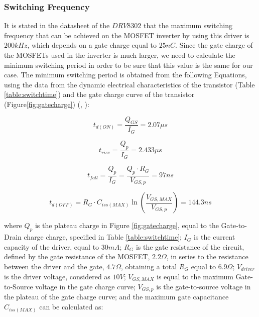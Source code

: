 \subsubsection{Switching Frequency}\label{subsec:sw_freq}

It is stated in the datasheet of the $DRV8302$ that the maximum switching frequency that can be achieved on the \ac{MOSFET} inverter by using this driver is $200 kHz$, which depends on a gate charge equal to $25 nC$. Since the gate charge of the \ac{MOSFET}s used in the inverter is much larger, we need to calculate the minimum switching period in order to be sure that this value is the same for our case. The minimum switching period is obtained from the following Equations, using the data from the dynamic electrical characteristics of the transistor (Table \ref{table:switchtime}) and the gate charge curve of the transistor (Figure\ref{fig:gatecharge}) (\citeauthor{GhioniPowerElec}, \citeyear{GhioniPowerElec}):

\begin{equation}
	t_{d(ON)} = \frac{Q_{GS}}{I_{G}} = 2.07\mu s
\end{equation}

\begin{equation}
	t_{rise} = \frac{Q_{p}}{I_{G}} = 2.433\mu s
\end{equation}

\begin{equation}
	t_{fall} = \frac{Q_{p}}{I_{G}} = \frac{Q_{p} \cdot R_{G}}{V_{GS,p}} = 97ns
\end{equation}

\begin{equation}
	t_{d(OFF)} = R_{G} \cdot C_{iss(MAX)} \ln (\frac{V_{GS,MAX}}{V_{GS,p}}) = 144.3ns
\end{equation}

\noindent
where $Q_{p}$ is the plateau charge in Figure \ref{fig:gatecharge}, equal to the Gate-to-Drain charge charge, specified in Table \ref{table:switchtime}; $I_{G}$ is the current capacity of the driver, equal to $30mA$; $R_{G}$ is the gate resistance of the circuit, defined by the gate resistance of the \ac{MOSFET}, $2.2\Omega$, in series to the resistance between the driver and the gate, $4.7\Omega$, obtaining a total $R_{G}$ equal to $6.9\Omega$; $V_{driver}$ is the driver voltage, considered as $10V$; $V_{GS,MAX}$ is equal to the maximum Gate-to-Source voltage in the gate charge curve; $V_{GS,p}$ is the gate-to-source voltage in the plateau of the gate charge curve; and the maximum gate capacitance $C_{iss(MAX)}$ can be calculated as:

